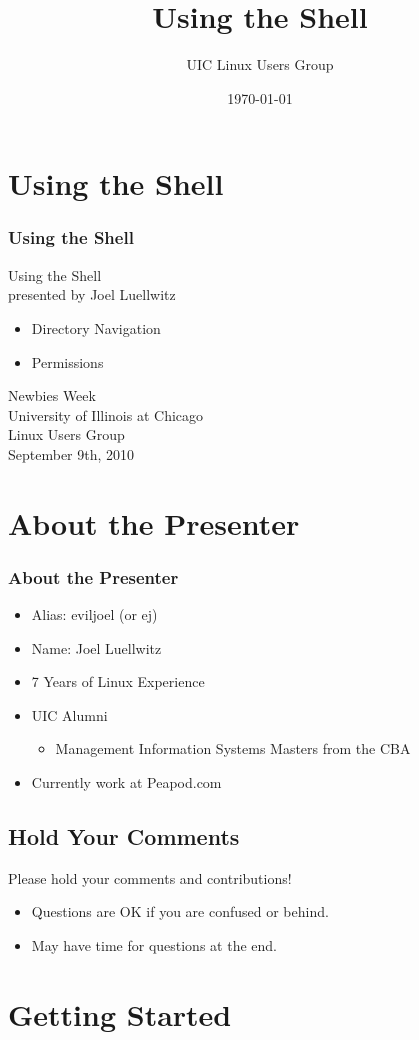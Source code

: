 \documentclass[hyperref={pdfpagelabels=false}]{beamer}
\title{Using the Shell}
\author{UIC Linux Users Group}
\date{\today}
\begin{document}
\frame{\titlepage}
\section{Using the Shell}
\frame
{
    \frametitle{Using the Shell}
    Using the Shell\\
    presented by Joel Luellwitz\\
    \begin{itemize}
    \item{Directory Navigation}
    \item{Permissions}
    \end{itemize}
    Newbies Week\\
    University of Illinois at Chicago\\
    Linux Users Group\\
    September 9th, 2010
}
\section{About the Presenter}
\frame
{
    \frametitle{About the Presenter}
    \begin{itemize}
    \item{Alias: eviljoel (or ej)}
    \item{Name: Joel Luellwitz}
    \item{7 Years of Linux Experience}
    \item{UIC Alumni}
        \begin{itemize}
        \item{Management Information Systems Masters from the CBA}
        \end{itemize}
    \item{Currently work at Peapod.com}
    \end{itemize}
	
}
\subsection{Hold Your Comments}
\frame
{
Please hold your comments and contributions!
    \begin{itemize}
    \item{Questions are OK if you are confused or behind.}
    \item{May have time for questions at the end.}
    \end{itemize}
}
\section{Getting Started}
\end{document}
